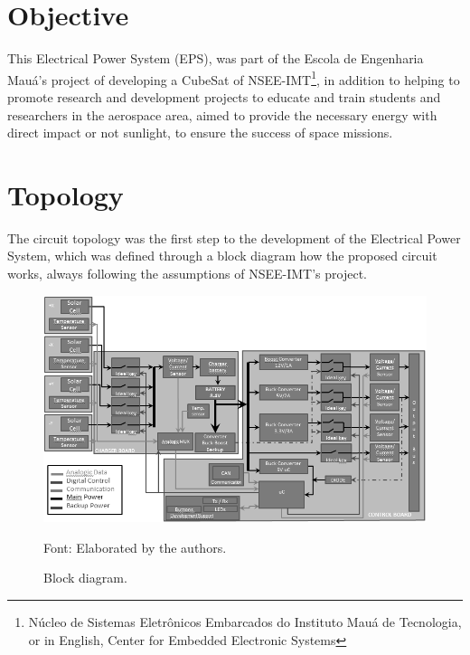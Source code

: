 \documentclass[3p]{elsarticle}
\begin{document}

\section{Objective}
\label{Objective}

	This Electrical Power System (EPS), was part of the Escola de Engenharia Mau\'{a}'s project of developing a CubeSat of NSEE-IMT\footnote{N\'{u}cleo de Sistemas Eletr\^{o}nicos Embarcados do Instituto Mau\'{a} de Tecnologia, or in English, Center for Embedded Electronic Systems}, in addition to helping to promote research and development projects to educate and train students and researchers in the aerospace area, aimed to provide the necessary energy with direct impact or not sunlight, to ensure the success of space missions.
	
\section{Topology}
\label{Topologia}

	The circuit topology was the first step to the development of the Electrical Power System, which was defined through a block diagram how the proposed circuit works, always following the assumptions of NSEE-IMT's project.\cite{Corsi}

	\begin{figure}[th]
		\label{Fig_diag}
		\centering
		\includegraphics[width=0.8\linewidth]{./figs/diag}
		\caption{Block diagram.}
		\begin{footnotesize}
		Font: Elaborated by the authors.
		\end{footnotesize}
	\end{figure}
	
	
	
\end{document}
